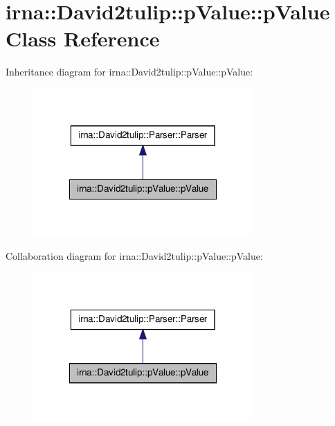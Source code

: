 \hypertarget{classirna_1_1David2tulip_1_1pValue_1_1pValue}{
\section{irna\-:\-:\-David2tulip\-:\-:p\-Value\-:\-:p\-Value \-Class \-Reference}
\label{classirna_1_1David2tulip_1_1pValue_1_1pValue}
}


\-Inheritance diagram for irna\-:\-:\-David2tulip\-:\-:p\-Value\-:\-:p\-Value\-:\nopagebreak
\begin{figure}[H]
\begin{center}
\leavevmode
\includegraphics[width=238pt]{classirna_1_1David2tulip_1_1pValue_1_1pValue__inherit__graph}
\end{center}
\end{figure}


\-Collaboration diagram for irna\-:\-:\-David2tulip\-:\-:p\-Value\-:\-:p\-Value\-:\nopagebreak
\begin{figure}[H]
\begin{center}
\leavevmode
\includegraphics[width=238pt]{classirna_1_1David2tulip_1_1pValue_1_1pValue__coll__graph}
\end{center}
\end{figure}
